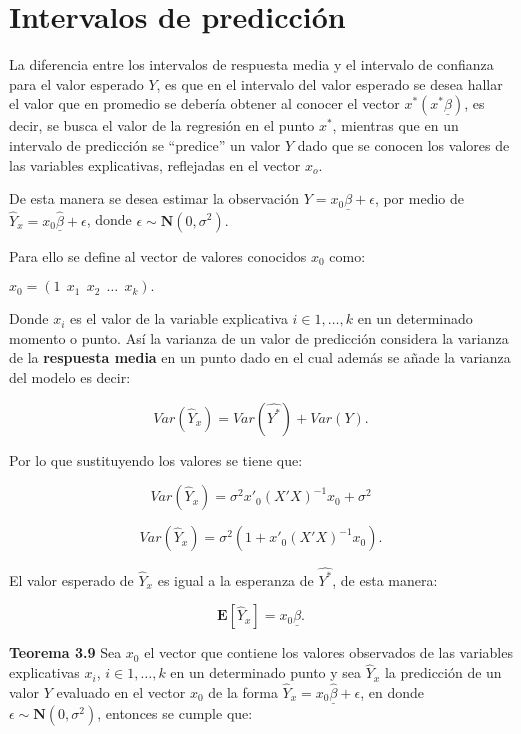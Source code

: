 \documentclass[
  a4paper,
  oneside,
  openany]{book}
\begin{document}
\hypertarget{intervalos-de-predicciuxf3n}{%
\section{Intervalos de predicción}\label{intervalos-de-predicciuxf3n}}

La diferencia entre los intervalos de respuesta media y el intervalo de confianza para el valor esperado \(Y\), es que en el intervalo del valor esperado se desea hallar el valor que en promedio se debería obtener al conocer el vector \(x^*(x^*\underline{\beta})\), es decir, se busca el valor de la regresión en el punto \(x^*\), mientras que en un intervalo de predicción se ``predice'' un valor \(Y\) dado que se conocen los valores de las variables explicativas, reflejadas en el vector \(x_{o}\).

De esta manera se desea estimar la observación \(Y=x_{0}\underline{\beta}+\epsilon\), por medio de \(\hat{Y}_{x}=x_{0}\underline{\hat{\beta}}+\epsilon\), donde \(\epsilon \sim \mathbf{N} (0, \sigma^2).\)

Para ello se define al vector de valores conocidos \(x_{0}\) como:

\(x_{0}=\left( 1 \ \ x_{1} \ \ x_{2} \ \ \ldots \ \ x_{k} \right).\)

Donde \(x_{i}\) es el valor de la variable explicativa \(i \in 1, \ldots,k\) en un determinado momento o punto. Así la varianza de un valor de predicción considera la varianza de la \textbf{respuesta media} en un punto dado en el cual además se añade la varianza del modelo es decir:

\[Var(\hat{Y}_{x})=Var(\hat{Y^*})+Var(Y).\]

Por lo que sustituyendo los valores se tiene que:

\[Var(\hat{Y}_{x})=\sigma^2x'_{0}(X'X)^{-1}x_{0}+\sigma^2\]

\[Var(\hat{Y}_{x})=\sigma^2\left(1+x'_{0}(X'X)^{-1}x_{0}\right).\]

El valor esperado de \(\hat{Y}_{x}\) es igual a la esperanza de \(\hat{Y^*}\), de esta manera:

\[\mathbf{E}[\hat{Y}_{x}]=x_{0}\underline{\beta}.\]

\textbf{Teorema 3.9} Sea \(x_{0}\) el vector que contiene los valores observados de las variables explicativas \(x_{i}\), \(i \in 1,\ldots,k\) en un determinado punto y sea \(\hat{Y}_{x}\) la predicción de un valor \(Y\) evaluado en el vector \(x_{0}\) de la forma \(\hat{Y}_{x}=x_{0}\underline{\hat{\beta}}+\epsilon\), en donde \(\epsilon \sim \mathbf{N}(0,\sigma^2)\), entonces se cumple que:
\end{document}
